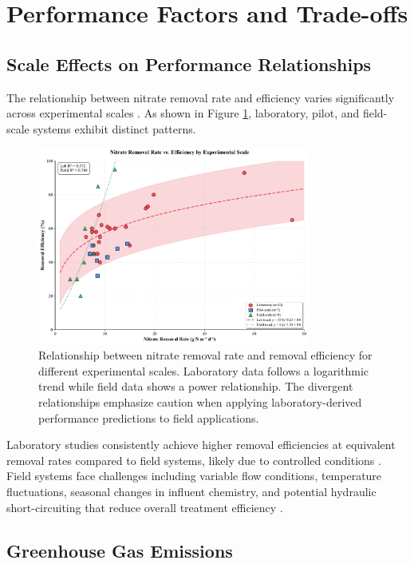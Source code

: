\documentclass[12pt,a4paper]{article}
\begin{document}
\section{Performance Factors and Trade-offs}

\subsection{Scale Effects on Performance Relationships}

The relationship between nitrate removal rate and efficiency varies significantly across experimental scales \citep{RN312, RN310}. As shown in Figure \ref{fig:rate_vs_efficiency}, laboratory, pilot, and field-scale systems exhibit distinct patterns.

\begin{figure}[H]
\centering
\includegraphics[width=0.8\textwidth]{fig2_rate_efficiency_scientific}
\caption{Relationship between nitrate removal rate and removal efficiency for different experimental scales. Laboratory data follows a logarithmic trend while field data shows a power relationship. The divergent relationships emphasize caution when applying laboratory-derived performance predictions to field applications.}
\label{fig:rate_vs_efficiency}
\end{figure}

Laboratory studies consistently achieve higher removal efficiencies at equivalent removal rates compared to field systems, likely due to controlled conditions \citep{RN611}. Field systems face challenges including variable flow conditions, temperature fluctuations, seasonal changes in influent chemistry, and potential hydraulic short-circuiting that reduce overall treatment efficiency \citep{RN312, RN309}.

\subsection{Greenhouse Gas Emissions}
\end{document}
